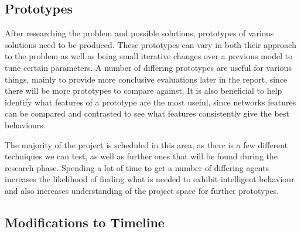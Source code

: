 \subsection{Prototypes}

After researching the problem and possible solutions, prototypes of various
solutions need to be produced. These prototypes can vary in both their approach
to the problem as well as being small iterative changes over a previous model
to tune certain parameters. A number of differing prototypes are useful for
various things, mainly to provide more conclusive evaluations later in the report,
since there will be more prototypes to compare against. It is also beneficial to
help identify what features of a prototype are the most useful, since networks
features can be compared and contrasted to see what features consistently give the
best behaviours.

The majority of the project is scheduled in this area, as there is a few
different techniques we can test, as well as further ones that will be found
during the research phase. Spending a lot of time to get a number of differing
agents increases the likelihood of finding what is needed to exhibit intelligent
behaviour and also increases understanding of the project space for further
prototypes.

\subsection{Modifications to Timeline}

